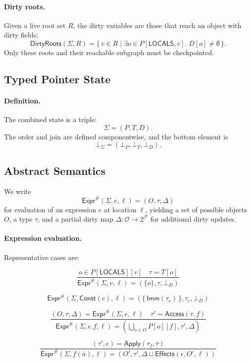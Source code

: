 \paragraph{Dirty roots.}
Given a live root set $R$,
the dirty variables are those that reach an object with dirty fields:
\[
\mathsf{DirtyRoots}(\Sigma, R) =
\{\, v \in R \mid \exists o \in P[\mathsf{LOCALS},v].\; D[o] \neq \emptyset \,\}.
\]
Only these roots and their reachable subgraph must be checkpointed.

\subsection{Typed Pointer State}

\paragraph{Definition.}
The combined state is a triple:
\[
\Sigma = (P, T, D).
\]
The order and join are defined componentwise, and the bottom element is
\[
\bot_\Sigma = (\bot_P, \bot_T, \bot_D).
\]

\subsection{Abstract Semantics}

We write
\[
\mathsf{Expr}^\#(\Sigma,e,\ell) = (O,\tau,\Delta)
\]
for evaluation of an expression $e$ at location $\ell$,
yielding a set of possible objects $O$, a type $\tau$,
and a partial dirty map $\Delta : \mathcal{O} \to 2^{\mathcal{F}}$
for additional dirty updates.

\paragraph{Expression evaluation.}
Representative cases are:

\[
\frac{o \in P[\mathsf{LOCALS}][v] \quad \tau = T[o]}
     {\mathsf{Expr}^\#(\Sigma, v, \ell) = (\{o\}, \tau, \bot_D)}
\]

\[
\mathsf{Expr}^\#(\Sigma,\mathsf{Const}(c),\ell) =
(\{\, \mathsf{Imm}(\tau_c) \,\}, \tau_c, \bot_D)
\]

\[
\frac{(O,\tau,\Delta) = \mathsf{Expr}^\#(\Sigma,e,\ell) \quad
      \tau' = \mathsf{Access}(\tau,f)}
     {\mathsf{Expr}^\#(\Sigma, e.f, \ell) =
       (\bigcup_{o \in O} P[o][f], \tau', \Delta)}
\]

\[
\frac{(\tau',\epsilon) = \mathsf{Apply}(\tau_f,\overline{\tau})}
     {\mathsf{Expr}^\#(\Sigma, f(\overline{a}), \ell) =
       (O', \tau', \Delta \sqcup \mathsf{Effects}(\epsilon,O',\ell))}
\]

